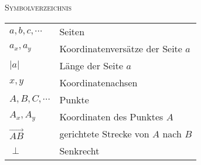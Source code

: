 \documentclass[a4paper]{amsart}
\theoremstyle{definition}
\begin{document}
\begin{large}
    \centerline{\textsc{Symbolverzeichnis}}
\end{large}
\bigskip

\renewcommand*{\arraystretch}{1}

\begin{tabular}{ll}
    $a,b,c, \cdots$               &Seiten\\
    $a_x,a_y$                   &Koordinatenversätze der Seite $a$\\
    $|a|$                       &Länge der Seite $a$\\
    $x, y$                      &Koordinatenachsen\\
    $A, B, C, \cdots$          &Punkte\\
    $A_x, A_y$                 &Koordinaten des Punktes $A$\\
    $\overrightarrow{AB}$      &gerichtete Strecke von $A$ nach $B$\\
    $\perp$                    &Senkrecht
\end{tabular}
\end{document}
